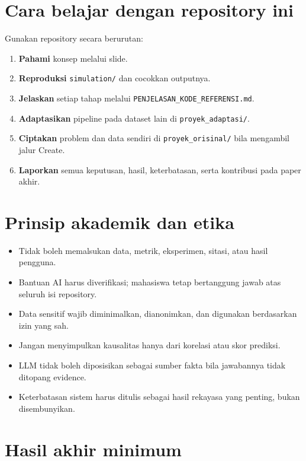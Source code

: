 \documentclass[
  indonesian,
  letterpaper,
  DIV=11,
  numbers=noendperiod]{scrreprt}
\providecommand{\tightlist}{%
  \setlength{\itemsep}{0pt}\setlength{\parskip}{0pt}}
\begin{document}
\section{Cara belajar dengan repository
ini}\label{cara-belajar-dengan-repository-ini}

Gunakan repository secara berurutan:

\begin{enumerate}
\def\labelenumi{\arabic{enumi}.}
\tightlist
\item
  \textbf{Pahami} konsep melalui slide.
\item
  \textbf{Reproduksi} \texttt{simulation/} dan cocokkan outputnya.
\item
  \textbf{Jelaskan} setiap tahap melalui
  \texttt{PENJELASAN\_KODE\_REFERENSI.md}.
\item
  \textbf{Adaptasikan} pipeline pada dataset lain di
  \texttt{proyek\_adaptasi/}.
\item
  \textbf{Ciptakan} problem dan data sendiri di
  \texttt{proyek\_orisinal/} bila mengambil jalur Create.
\item
  \textbf{Laporkan} semua keputusan, hasil, keterbatasan, serta
  kontribusi pada paper akhir.
\end{enumerate}

\section{Prinsip akademik dan etika}\label{prinsip-akademik-dan-etika}

\begin{itemize}
\tightlist
\item
  Tidak boleh memalsukan data, metrik, eksperimen, sitasi, atau hasil
  pengguna.
\item
  Bantuan AI harus diverifikasi; mahasiswa tetap bertanggung jawab atas
  seluruh isi repository.
\item
  Data sensitif wajib diminimalkan, dianonimkan, dan digunakan
  berdasarkan izin yang sah.
\item
  Jangan menyimpulkan kausalitas hanya dari korelasi atau skor prediksi.
\item
  LLM tidak boleh diposisikan sebagai sumber fakta bila jawabannya tidak
  ditopang evidence.
\item
  Keterbatasan sistem harus ditulis sebagai hasil rekayasa yang penting,
  bukan disembunyikan.
\end{itemize}

\section{Hasil akhir minimum}\label{hasil-akhir-minimum}
\end{document}
